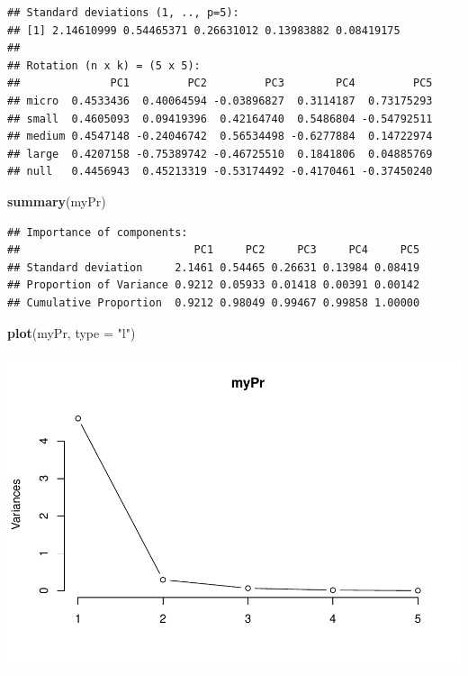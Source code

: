 \documentclass[]{article}
\newenvironment{Shaded}{\begin{snugshade}}{\end{snugshade}}
\newcommand{\KeywordTok}[1]{\textcolor[rgb]{0.13,0.29,0.53}{\textbf{#1}}}
\newcommand{\DataTypeTok}[1]{\textcolor[rgb]{0.13,0.29,0.53}{#1}}
\newcommand{\StringTok}[1]{\textcolor[rgb]{0.31,0.60,0.02}{#1}}
\newcommand{\NormalTok}[1]{#1}
\begin{document}
\begin{verbatim}
## Standard deviations (1, .., p=5):
## [1] 2.14610999 0.54465371 0.26631012 0.13983882 0.08419175
## 
## Rotation (n x k) = (5 x 5):
##              PC1         PC2         PC3        PC4         PC5
## micro  0.4533436  0.40064594 -0.03896827  0.3114187  0.73175293
## small  0.4605093  0.09419396  0.42164740  0.5486804 -0.54792511
## medium 0.4547148 -0.24046742  0.56534498 -0.6277884  0.14722974
## large  0.4207158 -0.75389742 -0.46725510  0.1841806  0.04885769
## null   0.4456943  0.45213319 -0.53174492 -0.4170461 -0.37450240
\end{verbatim}

\begin{Shaded}
\begin{Highlighting}[]
\KeywordTok{summary}\NormalTok{(myPr)}
\end{Highlighting}
\end{Shaded}

\begin{verbatim}
## Importance of components:
##                           PC1     PC2     PC3     PC4     PC5
## Standard deviation     2.1461 0.54465 0.26631 0.13984 0.08419
## Proportion of Variance 0.9212 0.05933 0.01418 0.00391 0.00142
## Cumulative Proportion  0.9212 0.98049 0.99467 0.99858 1.00000
\end{verbatim}

\begin{Shaded}
\begin{Highlighting}[]
\KeywordTok{plot}\NormalTok{(myPr, }\DataTypeTok{type =} \StringTok{"l"}\NormalTok{)}
\end{Highlighting}
\end{Shaded}

\includegraphics{TSLproject_files/figure-latex/unnamed-chunk-8-1.pdf}
\end{document}
